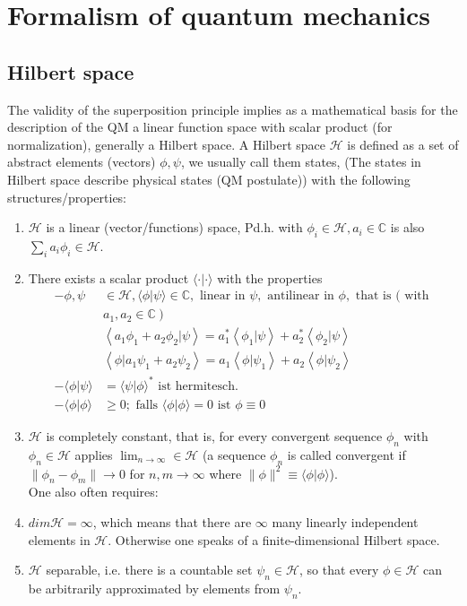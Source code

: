 \chapter{Formalism of quantum mechanics}
\section{Hilbert space}
The validity of the superposition principle implies as a mathematical basis for the description of the QM a linear function space with scalar product (for normalization), generally a Hilbert space.
A Hilbert space $\mathcal{H}$ is defined as a set of abstract elements (vectors) $\phi,\psi$, we usually call them states, (The states in Hilbert space describe physical states (QM postulate)) with the following structures/properties:
\begin{enumerate}
    \item $\mathcal{H}$ is a linear (vector/functions) space, Pd.h. with $\phi_i\in\mathcal{H},a_i\in\mathbb{C}$ is also $\sum_ia_i\phi_i\in\mathcal{H}$.
    \item There exists a scalar product $\langle\cdot|\cdot\rangle$ with the properties
    $$
    \begin{aligned}
        -\phi, \psi & \in \mathcal{H},\langle\phi | \psi\rangle \in \mathbb{C}, \text { linear in } \psi, \text { antilinear in } \phi, \text { that is }( \text { with } \\
        & \left.a_{1}, a_{2} \in \mathbb{C}\right) \\
        & \left\langle a_{1} \phi_{1}+a_{2} \phi_{2} | \psi\right\rangle= a_{1}^{*}\left\langle\phi_{1} | \psi\right\rangle+ a_{2}^{*}\left\langle\phi_{2} | \psi\right\rangle \\
        & \left\langle\phi | a_{1} \psi_{1}+a_{2} \psi_{2}\right\rangle = a_{1}\left\langle\phi | \psi_{1}\right\rangle+ a_{2}\left\langle\phi | \psi_{2}\right\rangle\\
        -\langle\phi | \psi\rangle & =\langle\psi | \phi\rangle^{*} \text { ist hermitesch. } \\
        -\langle\phi | \phi\rangle & \geq 0 ; \text { falls }\langle\phi | \phi\rangle= 0 \text { ist } \phi \equiv 0 
    \end{aligned}
    $$
    \item $\mathcal{H}$ is completely constant, that is, for every convergent sequence $\phi_n$ with $\phi_n\in\mathcal{H}$ applies $\lim_{n\to\infty}\in\mathcal{H}$ (a sequence $\phi_n$ is called convergent if $\parallel\phi_n-\phi_m\parallel\to0$ for $n,m\to\infty$ where $\parallel\phi\parallel^2\equiv\langle\phi|\phi\rangle$).\\ One also often requires:
    \item $dim\mathcal{H} = \infty$, which means that there are $\infty$ many linearly independent elements in $\mathcal{H}$. Otherwise one speaks of a finite-dimensional Hilbert space.
    \item $\mathcal{H}$ separable, i.e. there is a countable set ${\psi_n}\in\mathcal{H}$, so that every $\phi\in\mathcal{H}$ can be arbitrarily approximated by elements from ${\psi_n}$.
\end{enumerate}

